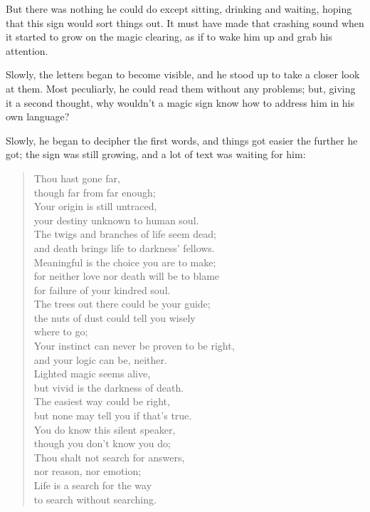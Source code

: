 But there was nothing he could do except sitting, drinking and waiting, hoping that this sign would sort things out. It must have made that crashing sound when it started to grow on the magic clearing, as if to wake him up and grab his attention.

Slowly, the letters began to become visible, and he stood up to take a closer look at them. Most peculiarly, he could read them without any problems; but, giving it a second thought, why wouldn't a magic sign know how to address him in his own language?

Slowly, he began to decipher the first words, and things got easier the further he got; the sign was still growing, and a lot of text was waiting for him:
\begin{quote}
Thou hast gone far,\\
though far from far enough;\\
Your origin is still untraced,\\
your destiny unknown to human soul.\\

The twigs and branches of life seem dead;\\
and death brings life to darkness' fellows.\\

Meaningful is the choice you are to make;\\
for neither love nor death will be to blame\\
for failure of your kindred soul.\\

The trees out there could be your guide;\\
the nuts of dust could tell you wisely\\
where to go;\\
Your instinct can never be proven to be right,\\
and your logic can be, neither.\\

Lighted magic seems alive,\\
but vivid is the darkness of death.\\

The easiest way could be right,\\
but none may tell you if that's true.\\
You do know this silent speaker,\\
though you don't know you do;\\

Thou shalt not search for answers,\\
nor reason, nor emotion;\\
Life is a search for the way\\
to search without searching.\\


\end{quote}
